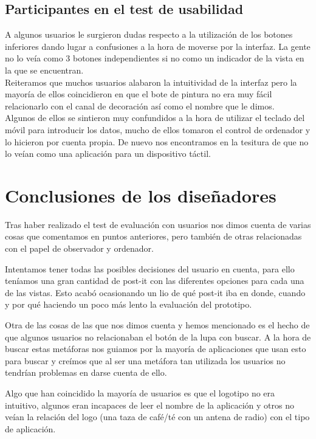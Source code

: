 \documentclass[a4paper]{article}
\begin{document}
\subsection{Participantes en el test de usabilidad}

A algunos usuarios le surgieron dudas respecto a la utilización de los botones inferiores  dando lugar a confusiones a la hora de moverse por la interfaz. La gente no lo veía como 3 botones independientes si no como un indicador de la vista en la que se encuentran.\\

Reiteramos que muchos usuarios alabaron la intuitividad de la interfaz pero la mayoría de ellos coincidieron en que el bote de pintura no era muy fácil relacionarlo con el canal de decoración así como el nombre que le dimos.\\

Algunos de ellos se sintieron muy confundidos a la hora de utilizar el teclado del móvil para introducir los datos, mucho de ellos tomaron el control de ordenador y lo hicieron por cuenta propia. De nuevo nos encontramos en la tesitura de que no lo veían como una aplicación para un dispositivo táctil.

\section{Conclusiones de los diseñadores}

Tras haber realizado el test de evaluación con usuarios nos dimos cuenta de varias cosas que comentamos en puntos anteriores, pero también  de otras relacionadas con el papel de observador y ordenador.

Intentamos tener todas las posibles decisiones del usuario en cuenta, para ello teníamos una gran cantidad de post-it con las diferentes opciones para cada una de las vistas. Esto acabó ocasionando un lio de qué post-it iba en donde, cuando y por qué haciendo un poco más lento la evaluación del prototipo.

Otra de las cosas de las que nos dimos cuenta y hemos mencionado es el hecho de que algunos usuarios no relacionaban el botón de la lupa con buscar. A la hora de buscar estas metáforas nos guiamos por la mayoría de aplicaciones que usan esto para buscar y creímos que al ser una metáfora tan utilizada los usuarios no tendrían problemas en darse cuenta de ello.

Algo que han coincidido la mayoría de usuarios es que el logotipo no era intuitivo, algunos eran incapaces de leer el nombre de la aplicación y otros no veían la relación del logo (una taza de café/té con un antena de radio) con el tipo de aplicación.
\end{document}
